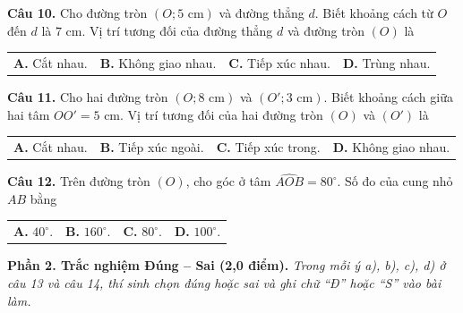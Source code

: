 \documentclass[11pt,a4paper]{article}
\begin{document}
\vspace{1.5mm}
\textbf{Câu 10.} Cho đường tròn $(O; 5\text{ cm})$ và đường thẳng $d$. Biết khoảng cách từ $O$ đến $d$ là $7\text{ cm}$. Vị trí tương đối của đường thẳng $d$ và đường tròn $(O)$ là\\
\begin{tabularx}{\linewidth}{XXXX}
\textbf{A.} Cắt nhau. & \textbf{B.} Không giao nhau. & \textbf{C.} Tiếp xúc nhau. & \textbf{D.} Trùng nhau.
\end{tabularx}

\vspace{1.5mm}
\textbf{Câu 11.} Cho hai đường tròn $(O; 8\text{ cm})$ và $(O'; 3\text{ cm})$. Biết khoảng cách giữa hai tâm $OO' = 5\text{ cm}$. Vị trí tương đối của hai đường tròn $(O)$ và $(O')$ là\\
\begin{tabularx}{\linewidth}{XXXX}
\textbf{A.} Cắt nhau. & \textbf{B.} Tiếp xúc ngoài. & \textbf{C.} Tiếp xúc trong. & \textbf{D.} Không giao nhau.
\end{tabularx}

\vspace{1.5mm}
\textbf{Câu 12.} Trên đường tròn $(O)$, cho góc ở tâm $\widehat{AOB} = 80^\circ$. Số đo của cung nhỏ $AB$ bằng\\
\begin{tabularx}{\linewidth}{XXXX}
\textbf{A.} $40^\circ$. & \textbf{B.} $160^\circ$. & \textbf{C.} $80^\circ$. & \textbf{D.} $100^\circ$.
\end{tabularx}

\vspace{3mm}
\noindent
\textbf{Phần 2. Trắc nghiệm Đúng -- Sai (2,0 điểm).} \textit{Trong mỗi ý a), b), c), d) ở câu 13 và câu 14, thí sinh chọn đúng hoặc sai và ghi chữ ``Đ'' hoặc ``S'' vào bài làm.}
\end{document}
